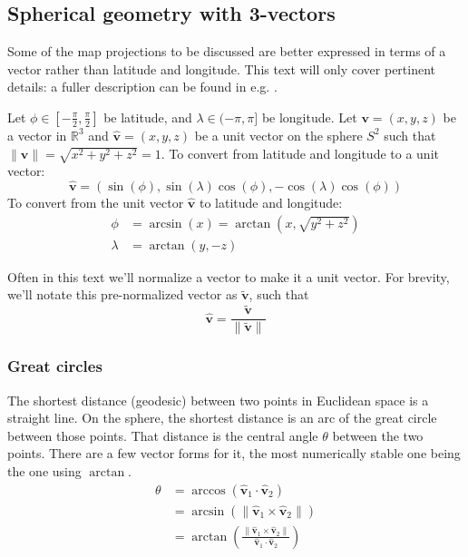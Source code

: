 \documentclass{amsart}[12pt]
\begin{document}
\subsection{Spherical geometry with 3-vectors}
Some of the map projections to be discussed are better expressed
in terms of a vector rather than latitude and longitude. This text will only
cover pertinent details: a fuller description can be found in e.g. \cite{gade}.

Let $\phi \in [-\frac{\pi}{2}, \frac{\pi}{2}]$ be latitude, and
$\lambda \in (-\pi, \pi]$ be longitude. Let $\mathbf v = (x, y, z)$ be a vector
in $\mathbb R^3$ and $\mathbf{\hat{v}} = (x, y, z)$ be a unit vector on the
sphere $S^2$ such that $\| \mathbf{\hat{v}} \| = \sqrt{x^2 + y^2 +z^2} = 1$.
To convert from latitude and longitude to a unit vector:
\begin{equation}
  \mathbf{\hat{v}} = \left(\sin (\phi), \sin (\lambda) \cos (\phi),
  -\cos (\lambda) \cos (\phi) \right)
\end{equation}
To convert from the unit vector $\mathbf{\hat{v}}$ to latitude and longitude:
\begin{equation}\begin{split}
  \phi &= \arcsin (x) = \arctan (x, \sqrt{y^2 + z^2}) \\
  \lambda &= \arctan (y, -z)
\end{split}\end{equation}

Often in this text we'll normalize a vector to make it a unit vector.
For brevity,
we'll notate this pre-normalized vector as $\mathbf{\widetilde{v}}$, such that
\begin{equation}
  \mathbf{\hat{v}} = \frac{\mathbf{\widetilde{v}}}{\|\mathbf{\widetilde{v}}\|}
\end{equation}

\subsubsection{Great circles}
The shortest distance (geodesic) between two points in Euclidean space is a
straight line. On the sphere, the shortest distance is an arc of the great
circle between those points. That distance is the central angle $\theta$
between the two points. There are a few vector forms for it, the most
numerically stable one being the one using $\arctan$.
\begin{equation}\begin{split}
\theta &= \arccos \left(\mathbf{\hat{v}}_1 \cdot \mathbf{\hat{v}}_2\right) \\
&= \arcsin \left(\|\mathbf{\hat{v}}_1 \times \mathbf{\hat{v}}_2\| \right) \\
&= \arctan \left( \frac{\|\mathbf{\hat{v}}_1 \times \mathbf{\hat{v}}_2\|}
  {\mathbf{\hat{v}}_1 \cdot \mathbf{\hat{v}}_2} \right)
\end{split}\end{equation}
\end{document}
